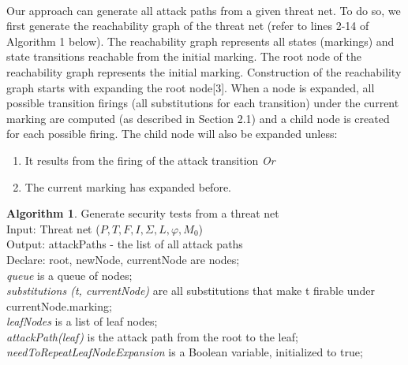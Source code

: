 \paragraph{}
Our approach can generate all attack paths from a given threat net. To do so, we first generate the reachability graph of the threat net (refer to lines 2-14 of Algorithm 1 below). The reachability graph represents all states (markings) and
state transitions reachable from the initial marking. The root
node of the reachability graph represents the initial marking.
Construction of the reachability graph starts with expanding
the root node[3]. When a node is expanded, all possible transition firings (all substitutions for each transition) under the current marking are computed (as described in Section 2.1) and a child node is created for each possible firing.
The child node will also be expanded unless:
\begin{enumerate}
\item It results from the firing of the attack transition \textit{Or} 
\item The current marking has expanded before.
\end{enumerate}
\newpage
\textbf{Algorithm 1}. Generate security tests from a threat net
\\Input: Threat net ($P,T,F,I,\Sigma,L,\varphi,M_0$)
\\Output: attackPaths - the list of all attack paths
\\Declare: root, newNode, currentNode are nodes;
\\ \textit{queue} is a queue of nodes;
\\ \textit{substitutions (t, currentNode)} are all substitutions that make t firable under currentNode.marking;
\\ \textit{leafNodes} is a list of leaf nodes;
\\ \textit{attackPath(leaf)} is the attack path from the root to the leaf;
\\ \textit{needToRepeatLeafNodeExpansion} is a Boolean variable,
initialized to true;
